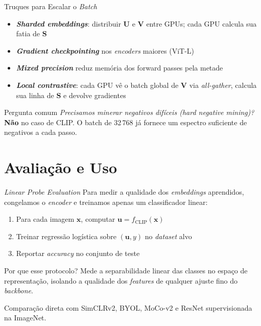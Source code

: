 \documentclass[aspectratio=169,xcolor=dvipsnames]{beamer}
\begin{document}
  \begin{frame}{Truques para Escalar o \textit{Batch}}
    \begin{itemize}
      \item \textbf{\textit{Sharded embeddings}}: distribuir $\mathbf{U}$ e $\mathbf{V}$ entre GPUs; cada GPU calcula sua fatia de $\mathbf{S}$
      \item \textbf{\textit{Gradient checkpointing}} nos \textit{encoders} maiores (ViT-L)
      \item \textbf{\textit{Mixed precision}} reduz memória dos forward passes pela metade
      \item \textbf{\textit{Local contrastive}}: cada GPU vê o batch global de $\mathbf{V}$ via \textit{all-gather}, calcula sua linha de $\mathbf{S}$ e devolve gradientes
    \end{itemize}

    \vspace{0.4em}
    \begin{block}{Pergunta comum}
      \emph{Precisamos minerar negativos difíceis (\textit{hard negative mining})?}\\
      \textbf{Não} no caso de CLIP. O batch de 32\,768 já fornece um espectro
      suficiente de negativos a cada passo.
    \end{block}
  \end{frame}

  \section{Avaliação e Uso}

  \begin{frame}{\textit{Linear Probe Evaluation}}
    Para medir a qualidade dos \textit{embeddings} aprendidos, congelamos o \textit{encoder}
    e treinamos apenas um classificador linear:
    \begin{enumerate}
      \item Para cada imagem $\mathbf{x}$, computar $\mathbf{u} = f_{\text{CLIP}}(\mathbf{x})$
      \item Treinar regressão logística sobre $(\mathbf{u}, y)$ no \textit{dataset} alvo
      \item Reportar \textit{accuracy} no conjunto de teste
    \end{enumerate}

    \vspace{0.4em}
    \begin{block}{Por que esse protocolo?}
      Mede a separabilidade linear das classes no espaço de representação, isolando
      a qualidade dos \textit{features} de qualquer ajuste fino do \textit{backbone}.
    \end{block}

    \vspace{0.3em}
    Comparação direta com SimCLRv2, BYOL, MoCo-v2 e ResNet supervisionada na ImageNet.
  \end{frame}
\end{document}
